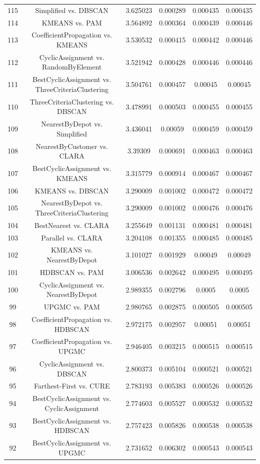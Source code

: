 \documentclass[a4paper,10pt]{article}
\begin{document}
\begin{landscape}
\begin{table}[!htp]
\begin{tabular}{cccccc}
115&Simplified vs. DBSCAN&3.625023&0.000289&0.000435&0.000435\\
114&KMEANS vs. PAM&3.564892&0.000364&0.000439&0.000446\\
113&CoefficientPropagation vs. KMEANS&3.530532&0.000415&0.000442&0.000446\\
112&CyclicAssignment vs. RandomByElement&3.521942&0.000428&0.000446&0.000446\\
111&BestCyclicAssignment vs. ThreeCriteriaClustering&3.504761&0.000457&0.00045&0.00045\\
110&ThreeCriteriaClustering vs. DBSCAN&3.478991&0.000503&0.000455&0.000455\\
109&NearestByDepot vs. Simplified&3.436041&0.00059&0.000459&0.000459\\
108&NearestByCustomer vs. CLARA&3.39309&0.000691&0.000463&0.000463\\
107&BestCyclicAssignment vs. KMEANS&3.315779&0.000914&0.000467&0.000467\\
106&KMEANS vs. DBSCAN&3.290009&0.001002&0.000472&0.000472\\
105&NearestByDepot vs. ThreeCriteriaClustering&3.290009&0.001002&0.000476&0.000476\\
104&BestNearest vs. CLARA&3.255649&0.001131&0.000481&0.000481\\
103&Parallel vs. CLARA&3.204108&0.001355&0.000485&0.000485\\
102&KMEANS vs. NearestByDepot&3.101027&0.001929&0.00049&0.00049\\
101&HDBSCAN vs. PAM&3.006536&0.002642&0.000495&0.000495\\
100&CyclicAssignment vs. NearestByDepot&2.989355&0.002796&0.0005&0.0005\\
99&UPGMC vs. PAM&2.980765&0.002875&0.000505&0.000505\\
98&CoefficientPropagation vs. HDBSCAN&2.972175&0.002957&0.00051&0.00051\\
97&CoefficientPropagation vs. UPGMC&2.946405&0.003215&0.000515&0.000515\\
96&CyclicAssignment vs. DBSCAN&2.800373&0.005104&0.000521&0.000521\\
95&Farthest-First vs. CURE&2.783193&0.005383&0.000526&0.000526\\
94&BestCyclicAssignment vs. CyclicAssignment&2.774603&0.005527&0.000532&0.000532\\
93&BestCyclicAssignment vs. HDBSCAN&2.757423&0.005826&0.000538&0.000538\\
92&BestCyclicAssignment vs. UPGMC&2.731652&0.006302&0.000543&0.000543\\

\end{tabular}
\end{table}
\end{landscape}
\end{document}
